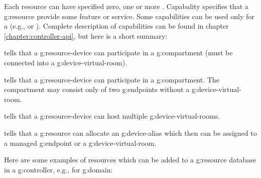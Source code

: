 Each resource can have specified zero, one or more . Capabality specifies that a \gls{g:resource} provide some feature or service. Some capabilities can be used only for a  (e.g.,  or ). Complete description of capabilities can be found in chapter \ref{chapter:controller-api}, but here is a short summary:
\begin{compactitem}
\item {} tells that a \gls{g:resource-device} can participate in a \gls{g:compartment} (must be connected into a \gls{g:device-virtual-room}).
\item {} tells that a \gls{g:resource-device} can participate in a \gls{g:compartment}. The compartment may consist only of two \glspl{g:endpoint} without a \gls{g:device-virtual-room}.
\item {} tells that a \gls{g:resource-device} can host multiple \glspl{g:device-virtual-room}.
\item {} tells that a \gls{g:resource} can allocate an \gls{g:device-alias} which then can be assigned to a managed \gls{g:endpoint} or a \gls{g:device-virtual-room}.
\end{compactitem}

Here are some examples of resources which can be added to a \gls{g:resource} database in a \gls{g:controller}, e.g., for  \gls{g:domain}:

